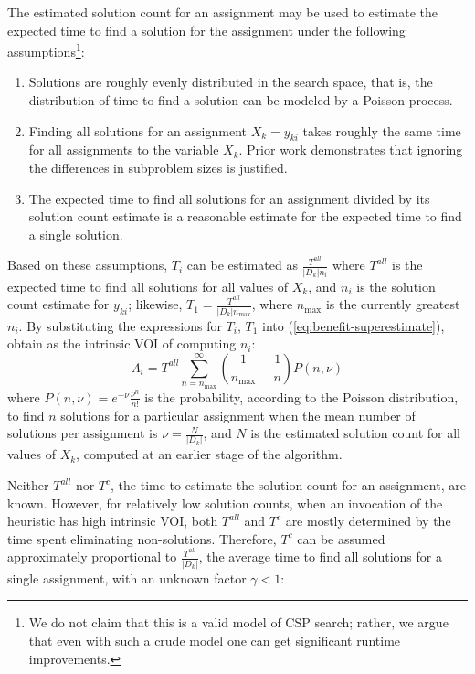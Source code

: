The estimated solution count for an assignment may be used to estimate
the expected time to find a solution for the assignment under the
following assumptions\footnote{We do not claim
that this is a valid model of CSP search; rather, we argue that even with such a crude model
one can get significant runtime improvements.}:
\begin{enumerate}
\item Solutions are roughly evenly distributed in the search space, that is,
   the distribution of time to find a solution can be modeled by a
   Poisson process.
\item Finding all solutions for an assignment $X_{k}=y_{ki}$
takes roughly the same time for all assignments to the variable $X_k$. Prior work
   \cite{Meisels.solcount,Kask.solcount} demonstrates that
   ignoring the differences in subproblem sizes is justified.
\item The expected time to find all solutions for an assignment
  divided by its solution count estimate is a
  reasonable estimate for the expected time to find a single solution. 
\end{enumerate}
Based on these assumptions, $T_i$ can be estimated as $\frac {T^{all}}
{|D_k|n_i}$ where $T^{all}$ is the expected time to find all
solutions for all values of $X_k$, and $n_i$ is the
solution count estimate for $y_{ki}$; likewise, $T_1=\frac
{T^{all}} {|D_k|n_\mathrm{max}}$, where $n_\mathrm{max}$ is the currently
greatest $n_i$.  By substituting the expressions for
$T_i$, $T_1$ into (\ref{eq:benefit-superestimate}), obtain
as the intrinsic VOI of computing $n_i$:
\begin{equation}
\label{eq:benefit-estimate-sc}
\Lambda_i=T^{all} \sum_{n=n_\mathrm{max}}^\infty\left(
  \frac 1 {n_\mathrm{max}} - \frac 1 n\right) P(n, \nu)
\end{equation}
where $P(n, \nu)=e^{-\nu}\frac {\nu^n} {n!}$ is the probability,
according to the Poisson distribution, to find $n$ solutions for a
particular assignment when the mean number of solutions per assignment
is $\nu=\frac N {|D_k|}$, and $N$ is the estimated solution count for
all values of $X_k$, computed at an earlier stage of the algorithm.

Neither $T^{all}$ nor $T^c$, the time to estimate the solution count
for an assignment, are known. However, for relatively low solution
counts, when an invocation of the heuristic has high intrinsic VOI, both
$T^{all}$ and $T^c$ are mostly determined by the time spent eliminating
non-solutions. Therefore, $T^c$ can be assumed approximately proportional
to $\frac {T^{all}} {|D_k|}$, the average time to find all solutions
for a single assignment, with an unknown factor $\gamma < 1$:

